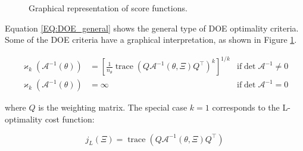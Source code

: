 \documentclass[a4paper,fleqn]{cas-dc}
\begin{document}
		\begin{figure}[!h]
			\centering
			\caption{Graphical representation of score functions.}
			\label{fig:score_fun}
		\end{figure}
		
		Equation \ref{EQ:DOE_general} shows the general type of DOE optimality criteria. Some of the DOE criteria have a graphical interpretation, as shown in Figure \ref{fig:score_fun}.
		
		{\footnotesize 
			\begin{align} \label{EQ:DOE_general}
				\varkappa_k\left( \mathcal{A}^{-1}(\theta) \right) &= \left[ \frac{1}{n_\theta} \operatorname{trace}\left( Q \mathcal{A}^{-1}(\theta, \Xi) Q^\top \right)^k \right]^{1/k} & \text{if} \det \mathcal{A}^{-1} \neq 0 \nonumber \\ 
				\varkappa_k\left( \mathcal{A}^{-1}(\theta) \right) &= \infty & \text{if} \det \mathcal{A}^{-1} = 0
		\end{align} }
		
		where $Q$ is the weighting matrix. The special case $k=1$ corresponds to the L-optimality cost function:
		
		{\footnotesize \begin{equation} j_L(\Xi) = \operatorname{trace} \left( Q \mathcal{A}^{-1}(\theta, \Xi) Q^\top \right) \end{equation} }
		
\end{document}
